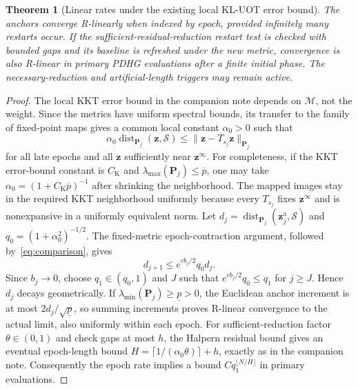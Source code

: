 \documentclass[11pt]{article}
\newtheorem{theorem}{Theorem}
\newcommand{\dist}{\operatorname{dist}}
\newcommand{\np}[2]{\lVert#1\rVert_{#2}}
\begin{document}
\begin{theorem}[Linear rates under the existing local KL-UOT error bound]
The anchors converge R-linearly when indexed by epoch, provided infinitely many restarts occur.
If the sufficient-residual-reduction restart test is checked with bounded gaps and its baseline is refreshed under the new metric, convergence is also R-linear in primary PDHG evaluations after a finite initial phase.
The necessary-reduction and artificial-length triggers may remain active.
\end{theorem}

\begin{proof}
The local KKT error bound in the companion note depends on $\mathcal M$, not the weight.
Since the metrics have uniform spectral bounds, its transfer to the family of fixed-point maps gives a common local constant $\alpha_0>0$ such that
\begin{equation}
\alpha_0\dist_{\mathbf P_j}(\mathbf z,\mathcal S)\leq\np{\mathbf z-T_{s_j}\mathbf z}{\mathbf P_j}
\end{equation}
for all late epochs and all $\mathbf z$ sufficiently near $\mathbf z^\infty$.
For completeness, if the KKT error-bound constant is $C_{\mathrm K}$ and $\lambda_{\max}(\mathbf P_j)\leq\overline p$, one may take $\alpha_0=(1+C_{\mathrm K}\overline p)^{-1}$ after shrinking the neighborhood.
The mapped images stay in the required KKT neighborhood uniformly because every $T_{s_j}$ fixes $\mathbf z^\infty$ and is nonexpansive in a uniformly equivalent norm.
Let $d_j=\dist_{\mathbf P_j}(\mathbf z_j^{\mathrm a},\mathcal S)$ and $q_0=(1+\alpha_0^2)^{-1/2}$.
The fixed-metric epoch-contraction argument, followed by~\eqref{eq:comparison}, gives
\begin{equation}
d_{j+1}\leq e^{cb_j/2}q_0d_j.
\end{equation}
Since $b_j\to0$, choose $q_1\in(q_0,1)$ and $J$ such that $e^{cb_j/2}q_0\leq q_1$ for $j\geq J$.
Hence $d_j$ decays geometrically.
If $\lambda_{\min}(\mathbf P_j)\geq\underline p>0$, the Euclidean anchor increment is at most $2d_j/\sqrt{\underline p}$, so summing increments proves R-linear convergence to the actual limit, also uniformly within each epoch.
For sufficient-reduction factor $\theta\in(0,1)$ and check gaps at most $h$, the Halpern residual bound gives an eventual epoch-length bound $H=\lceil1/(\alpha_0\theta)\rceil+h$, exactly as in the companion note.
Consequently the epoch rate implies a bound $Cq_1^{\lfloor N/H\rfloor}$ in primary evaluations.
\end{proof}
\end{document}
